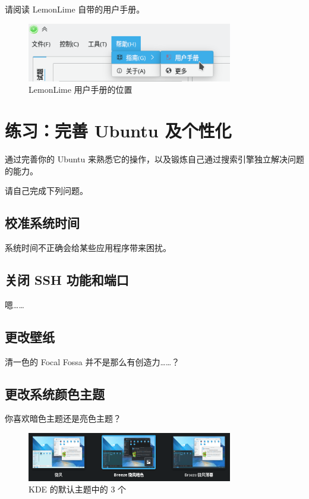 \documentclass[UTF-8]{ctexart}
\begin{document}
				请阅读 LemonLime 自带的用户手册。
				
				\begin{figure}[H]
					\centering
					\includegraphics[width=0.8\textwidth]{fig/lemonlime_manual.png}
					\caption*{LemonLime 用户手册的位置}
				\end{figure}
			
	\newpage
			
	\section{练习：完善 Ubuntu 及个性化}
		
		通过完善你的 Ubuntu 来熟悉它的操作，以及锻炼自己通过搜索引擎独立解决问题的能力。
		
		请自己完成下列问题。
		
		\subsection{校准系统时间}
		
			系统时间不正确会给某些应用程序带来困扰。
			
		\subsection{关闭 SSH 功能和端口}
			
			嗯……
		
		\subsection{更改壁纸}
		
			清一色的 Focal Fossa 并不是那么有创造力……？
			
		\subsection{更改系统颜色主题}
			
			你喜欢暗色主题还是亮色主题？
			
			\begin{figure}[H]
				\centering
				\includegraphics[width=0.8\textwidth]{fig/kde_theme.png}
				\caption*{KDE 的默认主题中的 3 个}
			\end{figure}
		
\end{document}

